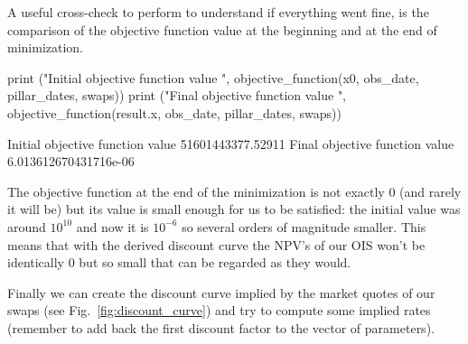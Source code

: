 A useful cross-check to perform to understand if everything went fine, is the comparison of the objective function value at the beginning and at the end of minimization.

\begin{ipython}
print ("Initial objective function value ", objective_function(x0, obs_date, 
                                          pillar_dates, swaps))
print ("Final objective function value ", objective_function(result.x, obs_date,
                                          pillar_dates, swaps))
\end{ipython}
\begin{ioutput}
Initial objective function value  51601443377.52911
Final objective function value  6.013612670431716e-06
\end{ioutput}
The objective function at the end of the minimization is not exactly 0 (and rarely it will be) but its value is small enough for us to be satisfied: the initial value was around $10^{10}$ and now it is $10^{-6}$ so several orders of magnitude smaller. This means that with the derived discount curve the NPV's of our OIS won't be identically 0 but so small that can be regarded as they would.

%

Finally we can create the discount curve implied by the market quotes of our swaps (see Fig.~\ref{fig:discount_curve}) and try to compute some implied rates (remember to add back the first discount factor to the vector of parameters).

